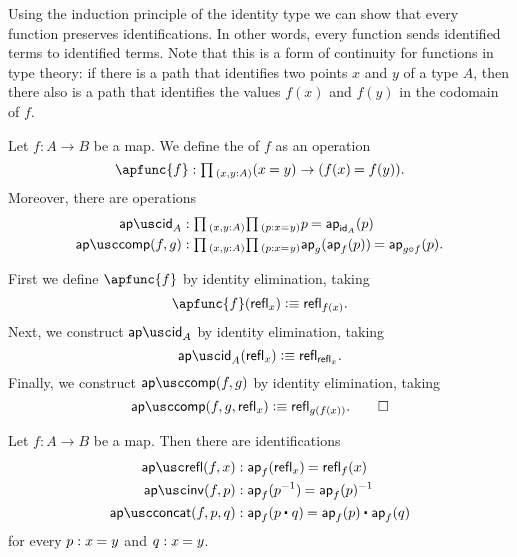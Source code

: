 Using the induction principle of the identity type we can show that every function preserves identifications.
In other words, every function sends identified terms to identified terms.
Note that this is a form of continuity for functions in type theory: if there is a path that identifies two points $x$ and $y$ of a type $A$, then there also is a path that identifies the values $f(x)$ and $f(y)$ in the codomain of $f$. 

\begin{defn}\label{defn:ap}
Let $f:A\to B$ be a map. We define the  of $f$ as an operation
\begin{equation*}
\apfunc{f} : \prd*{x,y:A} (\id{x}{y})\to(\id{f(x)}{f(y)}).
\end{equation*}
Moreover, there are operations
\begin{align*}
\apid_A & : \prd*{x,y:A}{p:\id{x}{y}} \id{p}{\ap{\idfunc[A]}{p}} \\
\apcomp(f,g) & : \prd*{x,y:A}{p:\id{x}{y}} \id{\ap{g}{\ap{f}{p}}}{\ap{g\circ f}{p}}.
\end{align*}
\end{defn}

\begin{constr}
First we define $\apfunc{f}$ by identity elimination, taking
\begin{equation*}
\apfunc{f}(\refl{x})\defeq \refl{f(x)}.
\end{equation*}
Next, we construct $\apid_A$ by identity elimination, taking
\begin{equation*}
\apid_A(\refl{x}) \defeq \refl{\refl{x}}.
\end{equation*}
Finally, we construct $\apcomp(f,g)$ by identity elimination, taking
\begin{equation*}
\apcomp(f,g,\refl{x}) \defeq \refl{g(f(x))}.\qedhere
\end{equation*}
\end{constr}

\begin{defn}\label{defn:ap-preserve}
Let $f:A\to B$ be a map. Then there are identifications
\begin{align*}
\aprefl(f,x) & : \id{\ap{f}{\refl{x}}}{\refl{f}(x)} \\
\apinv(f,p) & : \id{\ap{f}{p^{-1}}}{\ap{f}{p}^{-1}} \\
\apconcat(f,p,q) & : \id{\ap{f}{\ct{p}{q}}}{\ct{\ap{f}{p}}{\ap{f}{q}}}
\end{align*}
for every $p:\id{x}{y}$ and $q:\id{x}{y}$.
\end{defn}

